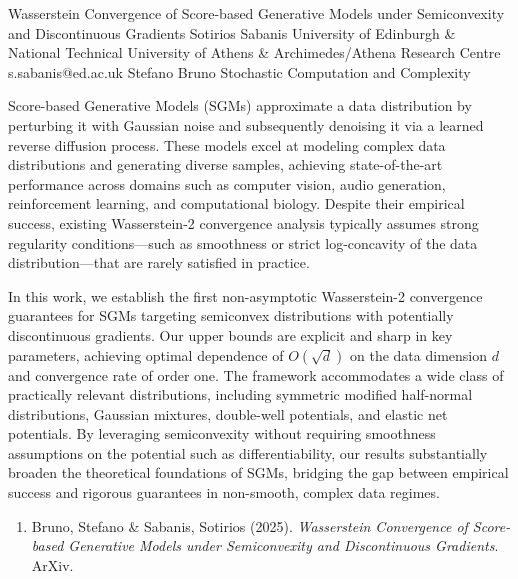 \begin{talk}
  {Wasserstein Convergence of Score-based Generative Models under Semiconvexity and Discontinuous Gradients }%
  {Sotirios Sabanis}%
  {University of Edinburgh \& National Technical University of Athens \& Archimedes/Athena Research Centre}%
  {s.sabanis@ed.ac.uk}%
  {Stefano Bruno}%
  {Stochastic Computation and Complexity}%
    
   
\noindent Score-based Generative Models (SGMs) approximate a data distribution by perturbing it with Gaussian noise and subsequently denoising it via a learned reverse diffusion process. These models excel at modeling complex data distributions and generating diverse samples, achieving state-of-the-art performance across domains such as computer vision, audio generation, reinforcement learning, and computational biology. Despite their empirical success, existing Wasserstein-2 convergence analysis typically assumes strong regularity conditions—such as smoothness or strict log-concavity of the data distribution—that are rarely satisfied in practice.
  
 \noindent In this work, we establish the first non-asymptotic Wasserstein-2 convergence guarantees for SGMs targeting semiconvex distributions with potentially discontinuous gradients. Our upper bounds are explicit and sharp in key parameters, achieving optimal dependence of $O(\sqrt{d})$ on the data dimension $d$ and convergence rate of order one. The framework accommodates a wide class of practically relevant distributions, including symmetric modified half-normal distributions, Gaussian mixtures, double-well potentials, and elastic net potentials. By leveraging semiconvexity without requiring smoothness assumptions on the potential such as differentiability, our results substantially broaden the theoretical foundations of SGMs, bridging the gap between empirical success and rigorous guarantees in non-smooth, complex data regimes.

\medskip


\begin{enumerate}
 \item[{[1]}] Bruno, Stefano \& Sabanis, Sotirios (2025). {\it Wasserstein Convergence of Score-based Generative Models under Semiconvexity and Discontinuous Gradients}. ArXiv.
\end{enumerate}


\end{talk}
